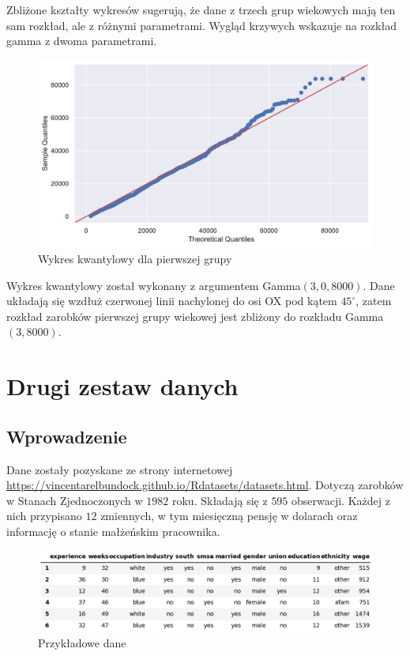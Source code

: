 \documentclass[12pt]{mwart}
\begin{document}
\noindent Zbliżone kształty wykresów sugerują, że dane z trzech grup wiekowych mają ten sam rozkład, ale z różnymi parametrami. Wygląd krzywych wskazuje na rozkład gamma z dwoma parametrami.


\begin{figure}[H]
	\begin{center}
	\includegraphics[scale=0.37]{qqplot1.pdf}
	\caption{Wykres kwantylowy dla pierwszej grupy}
	\end{center}
\end{figure}

\noindent Wykres kwantylowy został wykonany z argumentem Gamma$(3,0,8000)$. Dane układają się wzdłuż czerwonej linii nachylonej do osi OX pod kątem $45^{\circ}$, zatem rozkład zarobków pierwszej grupy wiekowej jest zbliżony do rozkładu Gamma$(3,8000)$.








\section{Drugi zestaw danych}
\subsection{Wprowadzenie}
\noindent Dane zostały pozyskane ze strony internetowej \url{https://vincentarelbundock.github.io/Rdatasets/datasets.html}. Dotyczą zarobków w Stanach Zjednoczonych w $1982$ roku. Składają się z $595$ obserwacji. Każdej z nich przypisano $12$ zmiennych, w tym miesięczną pensję w dolarach oraz informację o stanie małżeńskim pracownika.


\begin{figure}[H]
	\begin{center}
	\includegraphics[scale=0.5]{head2.png}
	\caption{Przykładowe dane}
	\end{center}
\end{figure}
\end{document}
